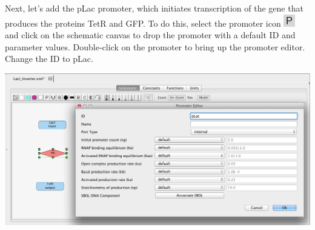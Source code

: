 \documentclass[titlepage,11pt]{article}
\begin{document}




Next, let's add the pLac promoter, which initiates transcription of the gene that produces the proteins TetR and GFP.  To do this, select the promoter icon \includegraphics{../gui/icons/modelview/promoter_mode_selected} and click on the schematic canvas to drop the promoter with a default ID and parameter values.  Double-click on the promoter to bring up the promoter editor.  Change the ID to pLac.
 
\begin{center}
\includegraphics[width=160mm]{screenshots/promoterGT} 
\end{center}
\end{document}
